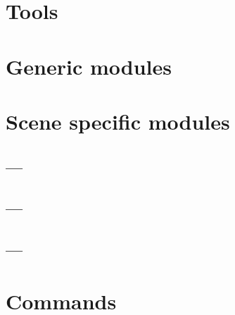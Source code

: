 \documentclass{manual}
\begin{document}



\chapter{Tools \label{tools}}





\chapter{Generic modules \label{modules1}}

\localmoduletable


























\chapter{Scene specific modules \label{modules2}}

\localmoduletable


\section{ --- }



\section{ --- }
\section{ --- }


\chapter{Commands \label{commands}}

\end{document}
